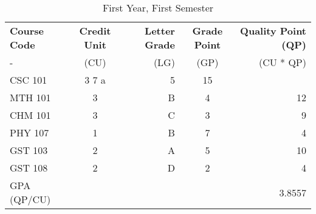 \documentclass{article}
\begin{document}
	
\begin{table}[h!]
	\begin{center}
		\caption{First Year, First Semester}
		\label{tab:table1}
		\begin{tabular}{l|c|r|c|r}
			\textbf{Course Code} & \textbf{Credit Unit} & \textbf{Letter Grade} & \textbf{Grade Point} & \textbf{Quality Point (QP)}\\ - & (CU) & (LG) & (GP) & (CU * QP) \\
			\hline
			\cellcolor{blue!23} CSC 101 & 3 7 a & 5 & 15\\
			\cellcolor{yellow!51} MTH 101 & 3 & B & 4 & 12\\
			\cellcolor{blue!81} CHM 101 & 3 & C & 3 & 9\\
			\cellcolor{blue!31}PHY 107 & 1 & B & 7 & 4\\
			\cellcolor{blue!31} GST 103 & 2 & A & 5 & 10\\
			\cellcolor{blue!31} GST 108 & 2 & D & 2 & 4\\ 
			\cellcolor{blue!31} GPA (QP/CU) & & & & 3.8557\\
		\end{tabular}
	\end{center}
\end{table}
\end{document}
